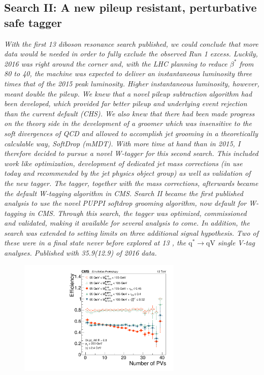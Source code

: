 \begin{singlespace}
\vspace*{\fill}
\begin{centering}
\section{Search II: A new pileup resistant, perturbative safe tagger}
\label{searchII}
\textit{
\noindent With the first 13 \TeV diboson resonance search published, we could conclude that more data would be needed in order to fully exclude the observed Run 1 excess. Luckily, 2016 was right around the corner and, with the LHC planning to reduce $\beta^*$ from 80 \cm to 40, the machine was expected to deliver an instantaneous luminosity three times that of the 2015 peak luminosity. Higher instantaneous luminosity, however, meant double the pileup.
\newline
\newline
We knew that a novel pileup subtraction algorithm had been developed, which provided far better pileup and underlying event rejection than the current default (CHS). We also knew that there had been made progress on the theory side in the development of a groomer which was insensitive to the soft divergences of QCD and allowed to accomplish jet grooming in a theoretically calculable way, SoftDrop (mMDT). With more time at hand than in 2015, I therefore decided to pursue a novel W-tagger for this second search. This included work like optimization, development of dedicated jet mass corrections (in use today and recommended by the jet physics object group) as well as validation of the new tagger. The tagger, together with the mass corrections, afterwards became the default W-tagging algorithm in CMS.
\newline
\newline
Search II became the first published analysis to use the novel PUPPI softdrop grooming algorithm, now default for W-tagging in CMS. Through this search, the tagger was optimized, commissioned and validated, making it available for several analysis to come. In addition, the search was extended to setting limits on three additional signal hypothesis. Two of these were in a final state never before explored at 13 \TeV, the $\textrm{q}^* \rightarrow \textrm{qV}$ single V-tag analyses. Published with 35.9(12.9) \fbinv of 2016 data.
}
\end{centering}
\begin{figure}[b!]
    \centering
    \includegraphics[height=5.5cm]{figures/vtagging/JME-16-003/BoostedW/WtagSigEffvsNPV.pdf}

\end{figure}
\end{singlespace}
